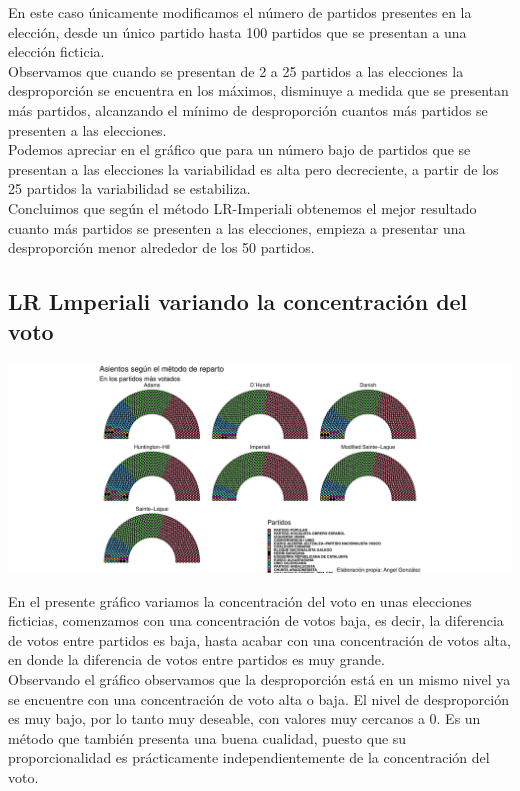 \documentclass[12pt,a4paper,]{book}
\numberwithin{dummy}{section}
\theoremstyle{ocrenumbox}
\theoremstyle{blacknumex}
\theoremstyle{blacknumbox}
\theoremstyle{ocrenum}
\theoremstyle{ocrenum}
\begin{document}
En este caso únicamente modificamos el número de partidos presentes en
la elección, desde un único partido hasta 100 partidos que se presentan
a una elección ficticia.\\
Observamos que cuando se presentan de 2 a 25 partidos a las elecciones
la desproporción se encuentra en los máximos, disminuye a medida que se
presentan más partidos, alcanzando el mínimo de desproporción cuantos
más partidos se presenten a las elecciones.\\
Podemos apreciar en el gráfico que para un número bajo de partidos que
se presentan a las elecciones la variabilidad es alta pero decreciente,
a partir de los 25 partidos la variabilidad se estabiliza.\\
Concluimos que según el método LR-Imperiali obtenemos el mejor resultado
cuanto más partidos se presenten a las elecciones, empieza a presentar
una desproporción menor alrededor de los 50 partidos.

\hypertarget{lr-lmperiali-variando-la-concentraciuxf3n-del-voto}{%
\subsection{LR Lmperiali variando la concentración del
voto}\label{lr-lmperiali-variando-la-concentraciuxf3n-del-voto}}

\begin{center}\includegraphics[width=0.95\linewidth]{figurasR/unnamed-chunk-65-1} \end{center}

En el presente gráfico variamos la concentración del voto en unas
elecciones ficticias, comenzamos con una concentración de votos baja, es
decir, la diferencia de votos entre partidos es baja, hasta acabar con
una concentración de votos alta, en donde la diferencia de votos entre
partidos es muy grande.\\
Observando el gráfico observamos que la desproporción está en un mismo
nivel ya se encuentre con una concentración de voto alta o baja. El
nivel de desproporción es muy bajo, por lo tanto muy deseable, con
valores muy cercanos a 0. Es un método que también presenta una buena
cualidad, puesto que su proporcionalidad es prácticamente
independientemente de la concentración del voto.
\end{document}
